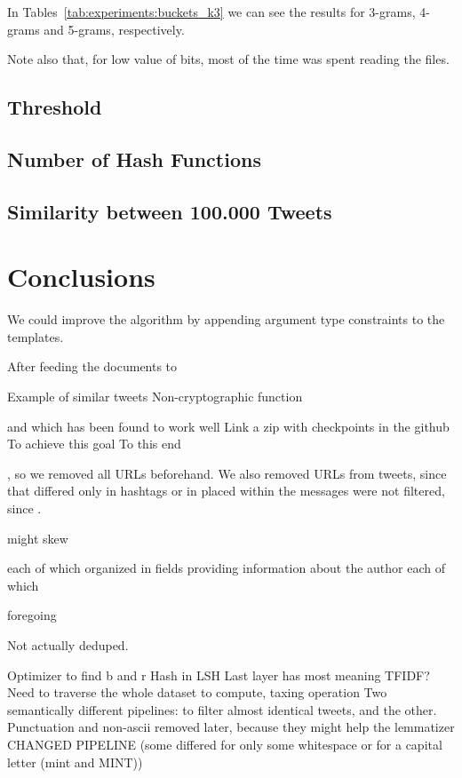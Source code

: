 \documentclass[runningheads]{llncs}
\begin{document}
In Tables~\ref{tab:experiments:buckets_k3} we can see the results for 3-grams, 4-grams and 5-grams, respectively.  

Note also that, for low value of bits, most of the time was spent reading the files.


\subsection{Threshold}
\label{subsec:experiments:threshold}

\subsection{Number of Hash Functions}
\label{subsec:experiments:hashes}

\subsection{Similarity between 100.000 Tweets}
\label{subsec:experiments:100k}



\section{Conclusions}
\label{sec:conclusions}

We could improve the algorithm by appending argument type constraints to the templates.


After feeding the documents to 

Example of similar tweets
Non-cryptographic function

and which has been found to work well  
Link a zip with checkpoints in the github
To achieve this goal
To this end

, so we removed all URLs 
beforehand. 
We also removed URLs from tweets, since that differed only in hashtags or in  placed within the messages were not filtered, since . 

might skew

each of which organized in fields providing information about the author
each of which  

foregoing

Not actually deduped.

Optimizer to find b and r
Hash in LSH
Last layer has most meaning
TFIDF? Need to traverse the whole dataset to compute, taxing operation
Two semantically different pipelines: to filter almost identical tweets, and the other.
Punctuation and non-ascii removed later, because they might help the lemmatizer
CHANGED PIPELINE (some differed for only some whitespace or for a capital letter (mint and MINT))
\end{document}
